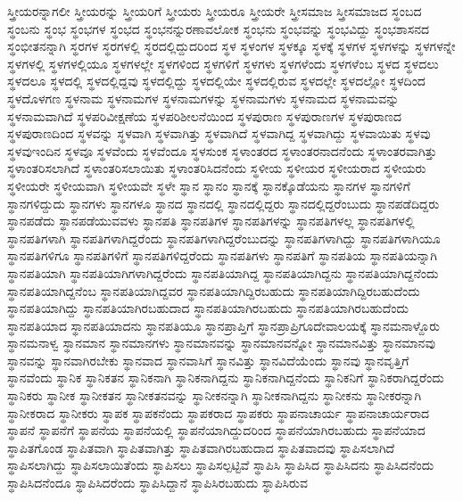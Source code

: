 {ಸ್ತ್ರೀಯರನ್ನಾಗಲೀ
ಸ್ತ್ರೀಯರನ್ನು
ಸ್ತ್ರೀಯರಿಗೆ
ಸ್ತ್ರೀಯರು
ಸ್ತ್ರೀಯರೂ
ಸ್ತ್ರೀಯರೇ
ಸ್ತ್ರೀಸಮಾಜ
ಸ್ತ್ರೀಸಮಾಜದ
ಸ್ಥಂಬದ
ಸ್ಥಂಬನು
ಸ್ಥಂಭ
ಸ್ಥಂಭಗಳ
ಸ್ಥಂಭದ
ಸ್ಥಂಭನನ್ನುರಣಾವಲೋಕ
ಸ್ಥಂಭನು
ಸ್ಥಂಭವನ್ನು
ಸ್ಥಂಭವಿದ್ದು
ಸ್ಥಂಭಶಾಸನದ
ಸ್ಥಂಭೀತನನ್ನಾಗಿ
ಸ್ಥರಗಳ
ಸ್ಥರಗಳಲ್ಲಿ
ಸ್ಥರದಲ್ಲಿದ್ದುದರಿಂದ
ಸ್ಥಳ
ಸ್ಥಳಂಗಳ
ಸ್ಥಳಕ್ಕೂ
ಸ್ಥಳಕ್ಕೆ
ಸ್ಥಳಗಳ
ಸ್ಥಳಗಳನ್ನು
ಸ್ಥಳಗಳನ್ನೇ
ಸ್ಥಳಗಳಲ್ಲಿ
ಸ್ಥಳಗಳಲ್ಲಿಯೂ
ಸ್ಥಳಗಳಲ್ಲೇ
ಸ್ಥಳಗಳಿಂದ
ಸ್ಥಳಗಳಿಗೆ
ಸ್ಥಳಗಳು
ಸ್ಥಳಗಳೆಂದು
ಸ್ಥಳಗಳೆಂಬ
ಸ್ಥಳದ
ಸ್ಥಳದಲು
ಸ್ಥಳದಲೂ
ಸ್ಥಳದಲ್ಲಿ
ಸ್ಥಳದಲ್ಲಿದ್ದವು
ಸ್ಥಳದಲ್ಲಿದ್ದು
ಸ್ಥಳದಲ್ಲಿಯೇ
ಸ್ಥಳದಲ್ಲಿರುವ
ಸ್ಥಳದಲ್ಲೇ
ಸ್ಥಳದಲ್ಲೋ
ಸ್ಥಳದಿಂದ
ಸ್ಥಳದೊಳಗಣ
ಸ್ಥಳನಾಮ
ಸ್ಥಳನಾಮಗಳ
ಸ್ಥಳನಾಮಗಳನ್ನು
ಸ್ಥಳನಾಮಗಳು
ಸ್ಥಳನಾಮದ
ಸ್ಥಳನಾಮವನ್ನು
ಸ್ಥಳನಾಮವಾಗಿದೆ
ಸ್ಥಳಪರಿವೀಕ್ಷಣೆಯ
ಸ್ಥಳಪರಿಶೀಲನೆಯಿಂದ
ಸ್ಥಳಪುರಾಣ
ಸ್ಥಳಪುರಾಣಗಳ
ಸ್ಥಳಪುರಾಣದ
ಸ್ಥಳಪುರಾಣದಿಂದ
ಸ್ಥಳವನ್ನು
ಸ್ಥಳವಾಗಿ
ಸ್ಥಳವಾಗಿತ್ತು
ಸ್ಥಳವಾಗಿದೆ
ಸ್ಥಳವಾಗಿದ್ದ
ಸ್ಥಳವಾಗಿದ್ದು
ಸ್ಥಳವಾಯಿತು
ಸ್ಥಳವು
ಸ್ಥಳವುಇಂದಿನ
ಸ್ಥಳವೂ
ಸ್ಥಳವೆಂದು
ಸ್ಥಳವೆಂದೂ
ಸ್ಥಳಸುಂಕ
ಸ್ಥಳಾಂತರದ
ಸ್ಥಳಾಂತರನಾದನೆಂದು
ಸ್ಥಳಾಂತರವಾಗಿತ್ತು
ಸ್ಥಳಾಂತರಿಸಲಾಗಿದೆ
ಸ್ಥಳಾಂತರಿಸಲಾಯಿತು
ಸ್ಥಳಾಂತರಿಸಿದನೆಂದು
ಸ್ಥಳೀಯ
ಸ್ಥಳೀಯರ
ಸ್ಥಳೀಯರಾದ
ಸ್ಥಳೀಯರು
ಸ್ಥಳೀಯರೇ
ಸ್ಥಳೀಯವಾಗಿ
ಸ್ಥಳೀಯವೇ
ಸ್ಥಳೇ
ಸ್ಥಾನ
ಸ್ಥಾನಂ
ಸ್ಥಾನಕ್ಕೆ
ಸ್ಥಾನಕ್ಕೊಡೆಯನು
ಸ್ಥಾನಗಳ
ಸ್ಥಾನಗಳಿಗೆ
ಸ್ಥಾನಗಳಿದ್ದುದು
ಸ್ಥಾನಗಳು
ಸ್ಥಾನಗಳೂ
ಸ್ಥಾನದ
ಸ್ಥಾನದಲ್ಲಿ
ಸ್ಥಾನದಲ್ಲಿದ್ದರು
ಸ್ಥಾನದಲ್ಲಿದ್ದರೆಂಬುದು
ಸ್ಥಾನಪಡೆದಿದ್ದರು
ಸ್ಥಾನಪಡೆದು
ಸ್ಥಾನಪಡೆಯುವವಳು
ಸ್ಥಾನಪತಿ
ಸ್ಥಾನಪತಿಗಳ
ಸ್ಥಾನಪತಿಗಳನ್ನು
ಸ್ಥಾನಪತಿಗಳಲ್ಲ
ಸ್ಥಾನಪತಿಗಳಲ್ಲಿ
ಸ್ಥಾನಪತಿಗಳಾಗಿ
ಸ್ಥಾನಪತಿಗಳಾಗಿದ್ದರೆಂದು
ಸ್ಥಾನಪತಿಗಳಾಗಿದ್ದರೆಂಬುದನ್ನು
ಸ್ಥಾನಪತಿಗಳಾಗಿದ್ದು
ಸ್ಥಾನಪತಿಗಳಾಗಿಯೂ
ಸ್ಥಾನಪತಿಗಳಿಗೂ
ಸ್ಥಾನಪತಿಗಳಿಗೆ
ಸ್ಥಾನಪತಿಗಳಿದ್ದರೆಂದು
ಸ್ಥಾನಪತಿಗಳು
ಸ್ಥಾನಪತಿಗೆ
ಸ್ಥಾನಪತಿಯ
ಸ್ಥಾನಪತಿಯನ್ನಾಗಿ
ಸ್ಥಾನಪತಿಯಾಗಿ
ಸ್ಥಾನಪತಿಯಾಗಿಗಳಾಗಿದ್ದರೆಂದು
ಸ್ಥಾನಪತಿಯಾಗಿದ್ದ
ಸ್ಥಾನಪತಿಯಾಗಿದ್ದನು
ಸ್ಥಾನಪತಿಯಾಗಿದ್ದನೆಂದು
ಸ್ಥಾನಪತಿಯಾಗಿದ್ದನೆಂಬ
ಸ್ಥಾನಪತಿಯಾಗಿದ್ದವರ
ಸ್ಥಾನಪತಿಯಾಗಿದ್ದಿರಬಹುದು
ಸ್ಥಾನಪತಿಯಾಗಿದ್ದಿರಬಹುದೆಂದು
ಸ್ಥಾನಪತಿಯಾಗಿದ್ದು
ಸ್ಥಾನಪತಿಯಾಗಿರಬಹುದಾದ
ಸ್ಥಾನಪತಿಯಾಗಿರಬಹುದು
ಸ್ಥಾನಪತಿಯಾಗಿರಬಹುದೆಂದು
ಸ್ಥಾನಪತಿಯಾದ
ಸ್ಥಾನಪತಿಯಾದನು
ಸ್ಥಾನಪತಿಯೂ
ಸ್ಥಾನಪ್ರಾಪ್ತಿಗೆ
ಸ್ಥಾನಪ್ರಾಪ್ರಿಗೂದೇವಾಲಯಕ್ಕೆ
ಸ್ಥಾನಮನಾಳ್ದೊರು
ಸ್ಥಾನಮನಾಳ್ವ
ಸ್ಥಾನಮಾನ
ಸ್ಥಾನಮಾನಗಳು
ಸ್ಥಾನಮಾನವನ್ನು
ಸ್ಥಾನಮಾನವನ್ನೋ
ಸ್ಥಾನಮಾನವಿತ್ತು
ಸ್ಥಾನಮಾನವು
ಸ್ಥಾನವನ್ನು
ಸ್ಥಾನವಾಗಿರಬೇಕು
ಸ್ಥಾನವಾದ
ಸ್ಥಾನವಾಸಿಗೆ
ಸ್ಥಾನವಿತ್ತು
ಸ್ಥಾನವಿದೆಯೆಂದು
ಸ್ಥಾನವು
ಸ್ಥಾನವೃತ್ತಿಗೆ
ಸ್ಥಾನವೆಂದು
ಸ್ಥಾನಿಕ
ಸ್ಥಾನಿಕತನ
ಸ್ಥಾನಿಕನಾಗಿ
ಸ್ಥಾನಿಕನಾಗಿದ್ದನು
ಸ್ಥಾನಿಕನಾಗಿದ್ದನೆಂದು
ಸ್ಥಾನಿಕನಿಗೆ
ಸ್ಥಾನಿಕರಾಗಿದ್ದರೆಂದು
ಸ್ಥಾನಿಕರು
ಸ್ಥಾನೀಕ
ಸ್ಥಾನೀಕತನ
ಸ್ಥಾನೀಕತನವನ್ನು
ಸ್ಥಾನೀಕನನ್ನಾಗಿ
ಸ್ಥಾನೀಕನಾಗಿದ್ದನು
ಸ್ಥಾನೀಕನು
ಸ್ಥಾನೀಕರನ್ನಾಗಿ
ಸ್ಥಾನೀಕರಾದ
ಸ್ಥಾನೀಕರು
ಸ್ಥಾಪಕ
ಸ್ಥಾಪಕನೆಂದು
ಸ್ಥಾಪಕರಾದ
ಸ್ಥಾಪಕರು
ಸ್ಥಾಪನಾಚಾರ್ಯ
ಸ್ಥಾಪನಾಚಾರ್ಯರಾದ
ಸ್ಥಾಪನೆ
ಸ್ಥಾಪನೆಗೆ
ಸ್ಥಾಪನೆಯ
ಸ್ಥಾಪನೆಯಲ್ಲಿ
ಸ್ಥಾಪನೆಯಾಗಿದ್ದುದರಿಂದ
ಸ್ಥಾಪನೆಯಾಗಿರಬಹುದು
ಸ್ಥಾಪನೆಯಾದ
ಸ್ಥಾಪಿತಗೊಂಡ
ಸ್ಥಾಪಿತವಾಗಿ
ಸ್ಥಾಪಿತವಾಗಿತ್ತು
ಸ್ಥಾಪಿತವಾಗಿರಬಹುದಾದ
ಸ್ಥಾಪಿತವಾದವು
ಸ್ಥಾಪಿಸಲಾಗಿದೆ
ಸ್ಥಾಪಿಸಲಾಗಿದ್ದು
ಸ್ಥಾಪಿಸಲಾಯಿತೆಂದು
ಸ್ಥಾಪಿಸಲು
ಸ್ಥಾಪಿಸಲ್ಪಟ್ಟಿವೆ
ಸ್ಥಾಪಿಸಿ
ಸ್ಥಾಪಿಸಿದ
ಸ್ಥಾಪಿಸಿದನು
ಸ್ಥಾಪಿಸಿದನೆಂದು
ಸ್ಥಾಪಿಸಿದನೆಂದೂ
ಸ್ಥಾಪಿಸಿದರೆಂದು
ಸ್ಥಾಪಿಸಿದ್ದಾನೆ
ಸ್ಥಾಪಿಸಿರಬಹುದು
ಸ್ಥಾಪಿಸಿರುವ
}
